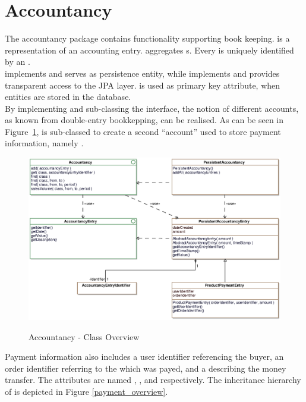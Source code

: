 \section{Accountancy}
\label{sec:accountancy}

The accountancy package contains functionality supporting book keeping.
 is a representation of an accounting entry.
 aggregates s.
Every  is uniquely identified by an .
\\

 implements  and serves as persistence entity, while  implements  and provides transparent access to the JPA layer.
 is used as primary key attribute, when entities are stored in the database.
\\

By implementing and sub-classing the  interface, the notion of different accounts, as known from double-entry bookkepping, can be realised.
As can be seen in Figure~\ref{accountancy_overview},  is sub-classed to create a second ``account'' used to store payment information, namely .
\begin{figure}
	\centering
  \includegraphics[width=1.0\textwidth]{images/Accountancy_Overview.eps}
	\label{accountancy_overview}
	\caption{Accountancy - Class Overview}
\end{figure}

Payment information also includes a user identifier referencing the buyer, an order identifier referring to the  which was payed, and a  describing the money transfer.
The attributes are named , , and  respectively.
The inheritance hierarchy of  is depicted in Figure \ref{payment_overview}.

